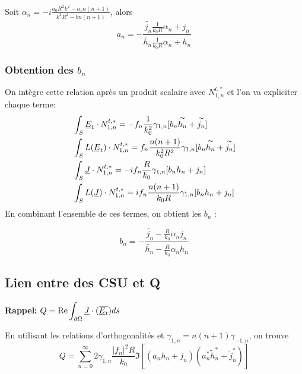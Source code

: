 Soit $ \alpha_n =-i\frac{a_0R^2k^2 - a_1 n (n+1)}{k^2R^2 - bn(n+1)}$, alors
\begin{equation}
  \label{eq_an_mie} a_n = -\frac{\tilde{j_n}\frac{1}{k_0R}\alpha_n +j_n}{\tilde{h_n}\frac{1}{k_0R}\alpha_n + h_n}
\end{equation}

\subsubsection{Obtention des $b_n$}
On intègre cette relation après un produit scalaire avec $N_{1,n}^{t,*}$ et l'on va expliciter chaque terme:
\begin{align*}
  &\int_S \E_t\cdot N_{1,n}^{t,*} = - f_n \frac{1}{k_0^2} \gamma_{1,n}[b_n\tilde{h_n} + \tilde{j_n} ]\\
  &\int_S L(\E_t)\cdot N_{1,n}^{t,*} =  f_n \frac{n(n+1)}{k_0^2R^2}\gamma_{1,n}[b_n\tilde{h_n} + \tilde{j_n}]\\
  &\int_S \J \cdot N_{1,n}^{t,*} = - i f_n \frac{R}{k_0}\gamma_{1,n}[b_n {h_n} + {j_n}]\\
  &\int_S L(\J) \cdot N_{1,n}^{t,*} =  i f_n \frac{n(n+1)}{k_0 R} \gamma_{1,n}[b_n {h_n} + {j_n}]\\
\end{align*}
En combinant l'ensemble de ces termes, on obtient les $b_n$ :

\begin{equation}
  \label{eq_bn_mie} b_n = -\frac{\tilde{j_n}- \frac{R}{k_0}\alpha_n j_n}{\tilde{h_n}-\frac{R}{k_0}\alpha_nh_n}
\end{equation}
\subsection{Lien entre des CSU et Q}
\textbf{Rappel:} $\ds Q=\Re{\int_{\d\Omega}\J\cdot(\conj{\E_t})ds}$

En utilisant les relations d'orthogonalités et $\gamma_{1,n} = n(n+1)\gamma_{-1,n}$, on trouve
\[
  Q = \sum_ {n=0}^{\infty}2\gamma_{1,n}\frac{|f_n|^2R}{k_0}\Im{
  \left[
    (a_n h_n + j_n)(a_n^* \tilde h_n^* + \tilde j_n^*) 
  \right]}
\]

\iffalse
\subsection{Notes, remarques}
Étant donnée la CI dans \cite{marceaux_high-order_2000} en $\n \pvect \E = Z \H_t$ et avec le fait qu'il intègre sur l'intérieur donc avec $M^i, N^i$, mes expressions des $a_n,b_n$ sont différentes, mais dans le même ordre d'idée : 
\[
a_n \mapsto b_n, \alpha_n \mapsto - i \eta_0/\eta k \alpha_n^{-1}
\]
\[
b_n \mapsto a_n, \beta_n \mapsto - i \eta_0/\eta k \beta_n^{-1}
\]
\fi


\begin{tikzpicture}

\end{tikzpicture}
